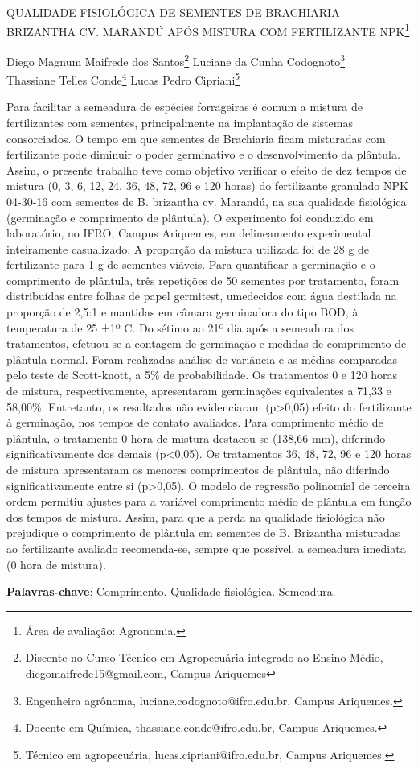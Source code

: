 \documentclass[article,12pt,onesidea,4paper,english,brazil]{abntex2}
\begin{document}
	
	
	\frenchspacing 
	
	\begin{center}
		\LARGE QUALIDADE FISIOLÓGICA DE SEMENTES DE \MakeUppercase{Brachiaria brizantha cv. Marandú} APÓS MISTURA COM FERTILIZANTE NPK\footnote{Área de avaliação: Agronomia.}
		
		\normalsize
	Diego Magnum Maifrede dos Santos\footnote{Discente no Curso Técnico em Agropecuária integrado ao Ensino Médio, diegomaifrede15@gmail.com, Campus Ariquemes} 
	Luciane da Cunha Codognoto\footnote{Engenheira agrônoma, luciane.codognoto@ifro.edu.br, Campus Ariquemes.} \\
		Thassiane Telles Conde\footnote{Docente em Química, thassiane.conde@ifro.edu.br, Campus Ariquemes.} 
	Lucas Pedro Cipriani\footnote{Técnico em agropecuária, lucas.cipriani@ifro.edu.br, Campus Ariquemes.} 
	\end{center}
	
	\noindent Para facilitar a semeadura de espécies forrageiras é comum a mistura de fertilizantes com sementes, principalmente na implantação de sistemas consorciados. O tempo em que sementes de Brachiaria ficam misturadas com fertilizante pode diminuir o poder germinativo e o desenvolvimento da plântula. Assim, o presente trabalho teve como objetivo verificar o efeito de dez tempos de mistura (0, 3, 6, 12, 24, 36, 48, 72, 96 e 120 horas) do fertilizante granulado NPK 04-30-16 com sementes de B. brizantha cv. Marandú, na sua qualidade fisiológica (germinação e comprimento de plântula). O experimento foi conduzido em laboratório, no IFRO, Campus Ariquemes, em delineamento experimental inteiramente casualizado. A proporção da mistura utilizada foi de 28 g de fertilizante para 1 g de sementes viáveis. Para quantificar a germinação e o comprimento de plântula, três repetições de 50 sementes por tratamento, foram distribuídas entre folhas de papel germitest, umedecidos com água destilada na proporção de 2,5:1 e mantidas em câmara germinadora do tipo BOD, à temperatura de 25 ±1º C. Do sétimo ao 21º dia após a semeadura dos tratamentos, efetuou-se a contagem de germinação e medidas de comprimento de plântula normal. Foram realizadas análise de variância e as médias comparadas pelo teste de Scott-knott, a 5\% de probabilidade. Os tratamentos 0 e 120 horas de mistura, respectivamente, apresentaram germinações equivalentes a 71,33 e 58,00\%. Entretanto, os resultados não evidenciaram (p>0,05) efeito do fertilizante à germinação, nos tempos de contato avaliados. Para comprimento médio de plântula, o tratamento 0 hora de mistura destacou-se (138,66 mm), diferindo significativamente dos demais (p<0,05). Os tratamentos 36, 48, 72, 96 e 120 horas de mistura apresentaram os menores comprimentos de plântula, não diferindo significativamente entre si (p>0,05). O modelo de regressão polinomial de terceira ordem permitiu ajustes para a variável comprimento médio de plântula em função dos tempos de mistura. Assim, para que a perda na qualidade fisiológica não prejudique o comprimento de plântula em sementes de B. Brizantha misturadas ao fertilizante avaliado recomenda-se, sempre que possível, a semeadura imediata (0 hora de mistura).  
	
	\vspace{\onelineskip}
	
	\noindent
	\textbf{Palavras-chave}: Comprimento. Qualidade fisiológica. Semeadura.
	
\end{document}

